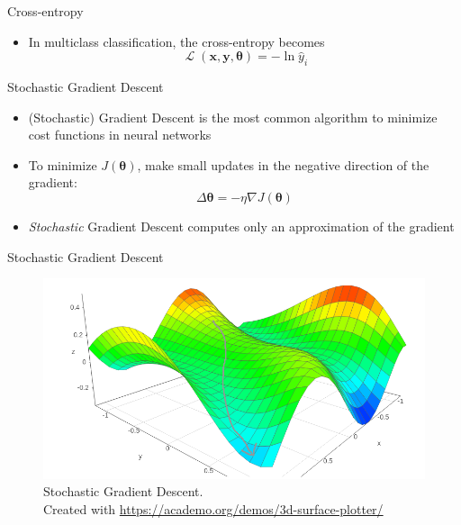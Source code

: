 \documentclass{beamer}
\DeclareMathOperator{\loss}{\mathcal{L}}
\begin{document}
	\begin{frame}{Cross-entropy}
		\begin{itemize}
			\item <1-> In multiclass classification, the cross-entropy becomes
			\begin{equation}
			\loss(\bm{x}, \bm{y}, \bm{\theta}) = -\ln \hat{y}_i
			\end{equation}
		\end{itemize}
	\end{frame}
	\begin{frame}{Stochastic Gradient Descent}
		\begin{itemize}
			\item <1-> (Stochastic) Gradient Descent is the most common algorithm to minimize cost functions in neural networks
			\item <2-> To minimize $J(\bm{\theta})$, make small updates in the negative direction of the gradient:
			\begin{equation}
			\Delta\bm{\theta} = -\eta\nabla J(\bm{\theta})
			\end{equation}
			\item <3-> \emph{Stochastic} Gradient Descent computes only an approximation of the gradient
		\end{itemize}
	\end{frame}
	\begin{frame}{Stochastic Gradient Descent}
		\begin{figure}
			\begin{center}
				\includegraphics[scale=.35]{fig/gradient_descent}
			\end{center}
			\caption{Stochastic Gradient Descent. \\Created with \url{https://academo.org/demos/3d-surface-plotter/}}
		\end{figure}
	\end{frame}
\end{document}
